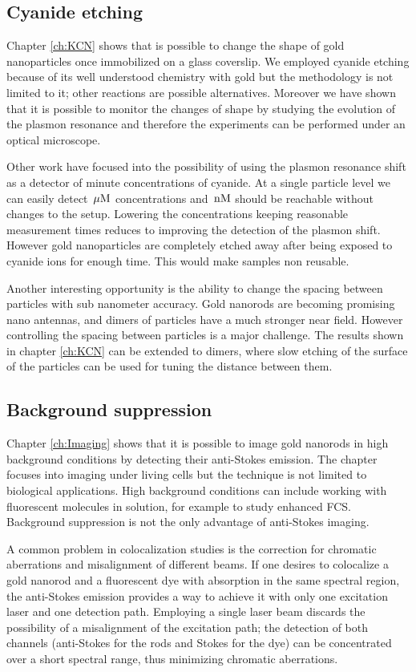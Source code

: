 \subsection{Cyanide etching}
Chapter \ref{ch:KCN} shows that is possible to change the shape of gold
nanoparticles once immobilized on a glass coverslip. We employed cyanide etching
because of its well understood chemistry with gold but the methodology is not
limited to it; other reactions are possible alternatives. Moreover we have shown
that it is possible to monitor the changes of shape by studying the evolution of
the plasmon resonance and therefore the experiments can be performed under an
optical microscope. 

Other work have focused into the possibility of using the plasmon resonance
shift as a detector of minute concentrations of cyanide\cite{Wei2012}.
At a single particle level we can easily detect $\,\mu\textrm{M}$ concentrations and $\,\textrm{nM}$
should be reachable without changes to the setup. Lowering the concentrations
keeping reasonable measurement times reduces to improving the detection of the
plasmon shift. However gold nanoparticles are completely etched away after being
exposed to cyanide ions for enough time. This would make samples non reusable.

Another interesting opportunity is the ability to change the spacing between
particles with sub nanometer accuracy\cite{Funston2009}. Gold nanorods are
becoming promising nano antennas, and dimers of particles have a much stronger
near field. However controlling the spacing between particles is a major
challenge. The results shown in chapter \ref{ch:KCN} can be extended to dimers,
where slow etching of the surface of the particles can be used for tuning the
distance between them.

\subsection{Background suppression}
Chapter \ref{ch:Imaging} shows that it is possible to image gold nanorods in
high background conditions by detecting their anti-Stokes emission. The chapter
focuses into imaging under living cells but the technique is not limited to
biological applications. High background conditions can include working with
fluorescent molecules in solution, for example to study enhanced
FCS\cite{Langguth2014}. Background suppression is not the only advantage of
anti-Stokes imaging.

A common problem in colocalization studies is the correction for chromatic
aberrations and misalignment of different beams. If one desires to colocalize a
gold nanorod and a fluorescent dye with absorption in the same spectral region,
the anti-Stokes emission provides a way to achieve it with only one excitation
laser and one detection path. Employing a single laser beam discards the
possibility of a misalignment of the excitation path; the detection of both
channels (anti-Stokes for the rods and Stokes for the dye) can be concentrated
over a short spectral range, thus minimizing chromatic aberrations.

